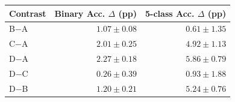 \begin{tabular}{lrr}
\toprule
Contrast & Binary Acc. $\Delta$ (pp) & 5-class Acc. $\Delta$ (pp) \\
\midrule
B$-$A & $1.07 \pm 0.08$ & $0.61 \pm 1.35$ \\
C$-$A & $2.01 \pm 0.25$ & $4.92 \pm 1.13$ \\
D$-$A & $2.27 \pm 0.18$ & $5.86 \pm 0.79$ \\
D$-$C & $0.26 \pm 0.39$ & $0.93 \pm 1.88$ \\
D$-$B & $1.20 \pm 0.21$ & $5.24 \pm 0.76$ \\
\bottomrule
\end{tabular}
